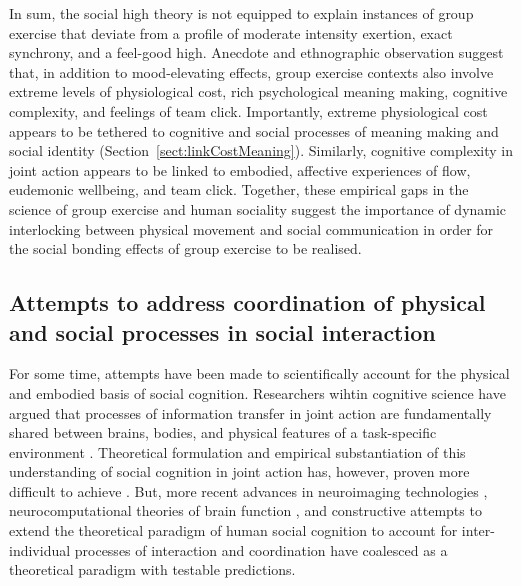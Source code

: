 \begin{CJK}{UTF8}{gbsn}
In sum, the social high theory is not equipped to explain instances of group exercise that deviate from a profile of moderate intensity exertion, exact synchrony, and a feel-good high.  Anecdote and ethnographic observation suggest that, in addition to mood-elevating effects, group exercise contexts also involve extreme levels of physiological cost, rich psychological meaning making, cognitive complexity, and feelings of team click.  Importantly, extreme physiological cost appears to be tethered to cognitive and social processes of meaning making and social identity (Section~\ref{sect:linkCostMeaning}).  Similarly, cognitive complexity in joint action appears to be linked to embodied, affective experiences of flow, eudemonic wellbeing, and team click.  Together, these empirical gaps in the science of group exercise and human sociality suggest the importance of dynamic interlocking between physical movement and social communication in order for the social bonding effects of group exercise to be realised.



\subsection{Attempts to address coordination of physical and social processes in social interaction}

For some time, attempts have been made to scientifically account for the physical and embodied basis of social cognition.  Researchers wihtin cognitive science have argued that processes of information transfer in joint action are fundamentally shared between brains, bodies, and physical features of a task-specific environment \citep{Hutchins1995,Kirsh2006,Susi2001}.  Theoretical formulation and empirical substantiation of this understanding of social cognition in joint action has, however, proven more difficult to achieve \citep[due in part to the tendency of the MES and CR to preference the functional role of symbolic and amodal cognitive processes; see][]{Semin2008,Yufik2013}.
But, more recent advances in neuroimaging technologies \citep{Frith2007}, neurocomputational theories of brain function \citep{Friston2010,Frith2010,Yufik2013,Clark2013}, and constructive attempts to extend the theoretical paradigm of human social cognition to account for inter-individual processes of interaction and coordination \citep[e.g.][]{Sebanz2006,Semin2008,Dale2014} have coalesced as a theoretical paradigm with testable predictions.


\end{CJK}

